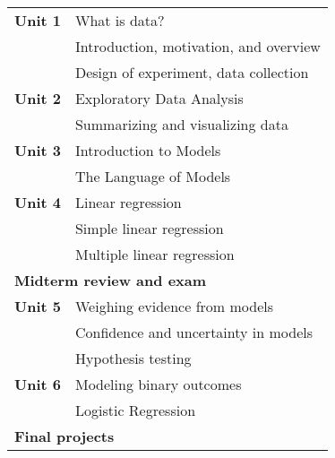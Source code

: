 \documentclass[10pt]{article}
\begin{document}
\begin{table}[htp]
\begin{tabular}{ll}
\bf Unit 1 & What is data?\\
       & Introduction, motivation, and overview \\
       & Design of experiment, data collection\\
\bf Unit 2 & Exploratory Data Analysis\\
       & Summarizing and visualizing data \\
\bf Unit 3 & Introduction to Models\\
       & The Language of Models\\
\bf Unit 4 & Linear regression \\
       & Simple linear regression \\
       & Multiple linear regression \\
\multicolumn{2}{l}{\bf Midterm review and exam}\\
\bf Unit 5 & Weighing evidence from models\\
       & Confidence and uncertainty in models\\
       & Hypothesis testing\\

\bf Unit 6 & Modeling binary outcomes \\ 
       & Logistic Regression\\

\multicolumn{2}{l}{\bf Final projects}
\end{tabular}
\end{table}%
\end{document}
